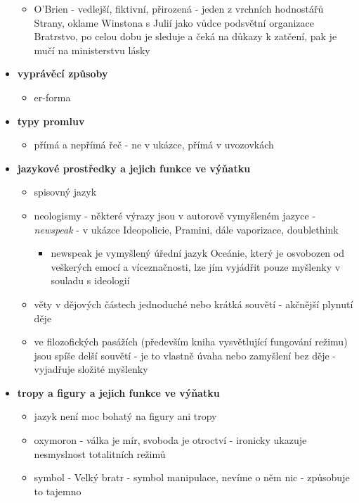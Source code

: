 \documentclass[11pt]{article}
\begin{document}
\begin{itemize}
\begin{itemize}
            \item O'Brien - vedlejší, fiktivní, přirozená - jeden z vrchních hodnostářů Strany, oklame Winstona s Julií jako vůdce podsvětní organizace Bratrstvo, po celou dobu je sleduje a čeká na důkazy k zatčení, pak je mučí na ministerstvu lásky
        \end{itemize}
        \item\textbf{vyprávěcí způsoby}
        \begin{itemize}
            \item er-forma
        \end{itemize}
        \item\textbf{typy promluv}
        \begin{itemize}
            \item přímá a nepřímá řeč - ne v ukázce, přímá v uvozovkách
        \end{itemize}
        \item\textbf{jazykové prostředky a jejich funkce ve výňatku}
        \begin{itemize}
            \item spisovný jazyk
            \item neologismy - některé výrazy jsou v autorově vymyšleném jazyce - \textit{newspeak} - v ukázce Ideopolicie, Pramini, dále vaporizace, doublethink
            \begin{itemize}
                \item newspeak je vymyšlený úřední jazyk Oceánie, který je osvobozen od veškerých emocí a víceznačnosti, lze jím vyjádřit pouze myšlenky v souladu s ideologií
            \end{itemize}
            \item věty v dějových částech jednoduché nebo krátká souvětí - akčnější plynutí děje
            \item ve filozofických pasážích (především kniha vysvětlující fungování režimu) jsou spíše delší souvětí - je to vlastně úvaha nebo zamyšlení bez děje - vyjadřuje složité myšlenky
        \end{itemize}
        \item\textbf{tropy a figury a jejich funkce ve výňatku}
        \begin{itemize}
            \item jazyk není moc bohatý na figury ani tropy
            \item oxymoron - válka je mír, svoboda je otroctví - ironicky ukazuje nesmyslnost totalitních režimů
            \item symbol - Velký bratr - symbol manipulace, nevíme o něm nic - způsobuje to tajemno
        \end{itemize}
    \end{itemize}
\end{document}
